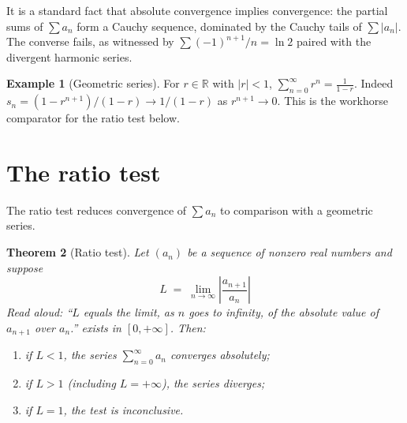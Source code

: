 \documentclass[11pt]{article}
\newtheorem{theorem}{Theorem}
\theoremstyle{definition}
\newtheorem{example}[theorem]{Example}
\begin{document}
It is a standard fact that absolute convergence implies convergence: the
partial sums of $\sum a_n$ form a Cauchy sequence, dominated by the Cauchy
tails of $\sum |a_n|$. The converse fails, as witnessed by
$\sum (-1)^{n+1}/n = \ln 2$ paired with the divergent harmonic series.

\begin{example}[Geometric series]
For $r \in \mathbb{R}$ with $|r| < 1$, $\sum_{n=0}^{\infty} r^n = \frac{1}{1-r}$.
Indeed $s_n = (1 - r^{n+1})/(1 - r) \to 1/(1-r)$ as $r^{n+1} \to 0$.
This is the workhorse comparator for the ratio test below.
\end{example}

\section{The ratio test}

The ratio test reduces convergence of $\sum a_n$ to comparison with a
geometric series.

\begin{theorem}[Ratio test]
\label{thm:ratio}
Let $(a_n)$ be a sequence of nonzero real numbers and suppose
\[
  L \;=\; \lim_{n \to \infty} \left| \frac{a_{n+1}}{a_n} \right|
\]
\emph{Read aloud:} ``$L$ equals the limit, as $n$ goes to infinity, of the
absolute value of $a_{n+1}$ over $a_n$.''
exists in $[0, +\infty]$. Then:
\begin{enumerate}
  \item if $L < 1$, the series $\sum_{n=0}^{\infty} a_n$ converges absolutely;
  \item if $L > 1$ (including $L = +\infty$), the series diverges;
  \item if $L = 1$, the test is inconclusive.
\end{enumerate}
\end{theorem}
\end{document}
